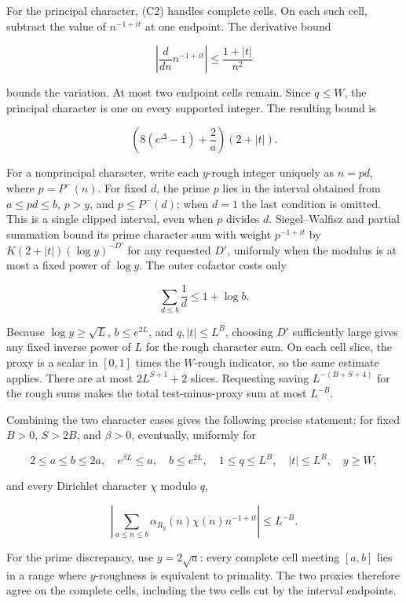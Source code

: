 For the principal character, (C2) handles complete cells. On each such
cell, subtract the value of \(n^{-1+it}\) at one endpoint. The
derivative bound

\[
\left|\frac{d}{dn}n^{-1+it}\right|\le\frac{1+|t|}{n^2}
\]

bounds the variation. At most two endpoint cells remain. Since
\(q\le W\), the principal character is one on every supported integer.
The resulting bound is

\[
\left(8(e^\Delta-1)+\frac2a\right)(2+|t|).
\]

For a nonprincipal character, write each \(y\)-rough integer uniquely as
\(n=pd\), where \(p=P^-(n)\). For fixed \(d\), the prime \(p\) lies in
the interval obtained from \(a\le pd\le b\), \(p>y\), and
\(p\le P^-(d)\); when \(d=1\) the last condition is omitted. This is a
single clipped interval, even when \(p\) divides \(d\). Siegel--Walfisz
and partial summation bound its prime character sum with weight
\(p^{-1+it}\) by \(K(2+|t|)(\log y)^{-D'}\) for any requested \(D'\),
uniformly when the modulus is at most a fixed power of \(\log y\). The
outer cofactor costs only

\[
\sum_{d\le b}\frac1d\le1+\log b.
\]

Because \(\log y\ge\sqrt L\), \(b\le e^{2L}\), and \(q,|t|\le L^B\),
choosing \(D'\) sufficiently large gives any fixed inverse power of
\(L\) for the rough character sum. On each cell slice, the proxy is a
scalar in \([0,1]\) times the \(W\)-rough indicator, so the same
estimate applies. There are at most \(2L^{S+1}+2\) slices. Requesting
saving \(L^{-(B+S+4)}\) for the rough sums makes the total
test-minus-proxy sum at most \(L^{-B}\).

Combining the two character cases gives the following precise statement:
for fixed \(B>0\), \(S>2B\), and \(\beta>0\), eventually, uniformly for

\[
2\le a\le b\le2a,\quad e^{\beta L}\le a,\quad b\le e^{2L},\quad
1\le q\le L^B,\quad |t|\le L^B,\quad y\ge W,
\]

and every Dirichlet character \(\chi\) modulo \(q\),

\[
\left|\sum_{a\le n\le b}\alpha_{R_y}(n)\chi(n)n^{-1+it}\right|
\le L^{-B}. \tag{C3}
\]

For the prime discrepancy, use \(y=2\sqrt a\): every complete cell
meeting \([a,b]\) lies in a range where \(y\)-roughness is equivalent to
primality. The two proxies therefore agree on the complete cells,
including the two cells cut by the interval endpoints.

